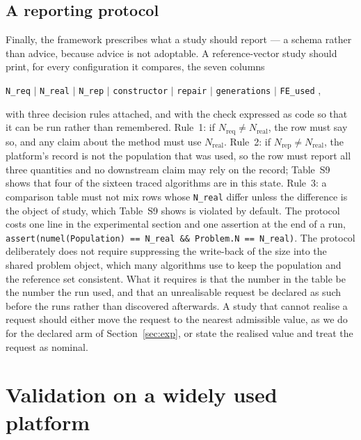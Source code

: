 \documentclass{SCIS2026}
\begin{document}
\subsection{A reporting protocol}
\label{sec:protocol}
Finally, the framework prescribes what a study should report --- a schema rather than advice, because advice is not adoptable. A reference-vector study should print, for every configuration it compares, the seven columns

\begin{center}
\texttt{N\_req} $\mid$ \texttt{N\_real} $\mid$ \texttt{N\_rep} $\mid$ \texttt{constructor} $\mid$ \texttt{repair} $\mid$ \texttt{generations} $\mid$ \texttt{FE\_used} ,
\end{center}

with three decision rules attached, and with the check expressed as code so that it can be run rather than remembered. Rule~1: if $N_{\mathrm{req}} \neq N_{\mathrm{real}}$, the row must say so, and any claim about the method must use $N_{\mathrm{real}}$. Rule~2: if $N_{\mathrm{rep}} \neq N_{\mathrm{real}}$, the platform's record is not the population that was used, so the row must report all three quantities and no downstream claim may rely on the record; Table~S9 shows that four of the sixteen traced algorithms are in this state. Rule~3: a comparison table must not mix rows whose \texttt{N\_real} differ unless the difference is the object of study, which Table~S9 shows is violated by default. The protocol costs one line in the experimental section and one assertion at the end of a run, \texttt{assert(numel(Population) == N\_real \&\& Problem.N == N\_real)}. The protocol deliberately does not require suppressing the write-back of the size into the shared problem object, which many algorithms use to keep the population and the reference set consistent. What it requires is that the number in the table be the number the run used, and that an unrealisable request be declared as such before the runs rather than discovered afterwards. A study that cannot realise a request should either move the request to the nearest admissible value, as we do for the declared arm of Section~\ref{sec:exp}, or state the realised value and treat the request as nominal.

\section{Validation on a widely used platform}
\label{sec:case}
\end{document}
